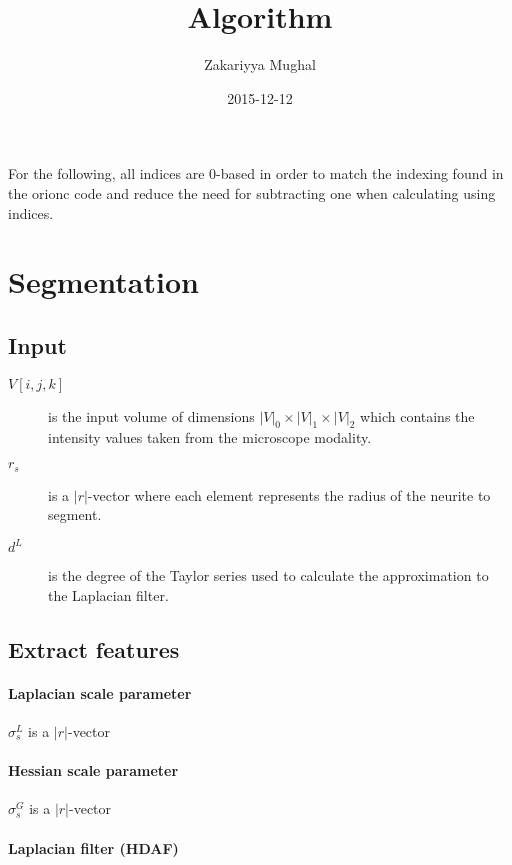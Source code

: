 \documentclass[12pt]{article}
\title{Algorithm}
\author{Zakariyya Mughal}
\date{2015-12-12}
\newcommand{\Dim}[1]{\ensuremath{\left|#1\right|}}
\newcommand{\InputVolumeIndices}{\ensuremath{[i,j,k]}}
\newcommand{\InputVolumeName}{\ensuremath{V}}
\newcommand{\InputVolume}{\ensuremath{\InputVolumeName\InputVolumeIndices}}
\newcommand{\InputVolumeDimensions}{\ensuremath{\Dim{\InputVolumeName}_0 \times \Dim{\InputVolumeName}_1 \times \Dim{\InputVolumeName}_2}}
\newcommand{\LaplacianFilterApproxDegree}{\ensuremath{d^{L}}}
\newcommand{\RadiiScalesName}{\ensuremath{r}}
\newcommand{\RadiiScales}{\ensuremath{\RadiiScalesName_{s}}}
\begin{document}
\maketitle
\tableofcontents

For the following, all indices are 0-based in order to match the
indexing found in the \gls{orionc} code and reduce the need for
subtracting one when calculating using indices.

\section{Segmentation}

\subsection{Input}

\begin{description}
	\item[\InputVolume{}] is the input volume of dimensions
		\InputVolumeDimensions{} which contains the intensity values taken
		from the microscope modality.
	\item[\RadiiScales{}] is a \Dim{\RadiiScalesName}-vector where each element
		represents the radius of the neurite to segment.
	\item[\LaplacianFilterApproxDegree{}] is the degree of the
		Taylor series used to calculate the approximation
		to the Laplacian filter.
\end{description}

\subsection{Extract features}

\paragraph{Laplacian scale parameter}

\(\sigma^{L}_{s}\) is a \Dim{\RadiiScalesName}-vector

\paragraph{Hessian scale parameter}

\(\sigma^{G}_{s}\) is a \Dim{\RadiiScalesName}-vector

\paragraph{Laplacian filter (HDAF)}
\end{document}
